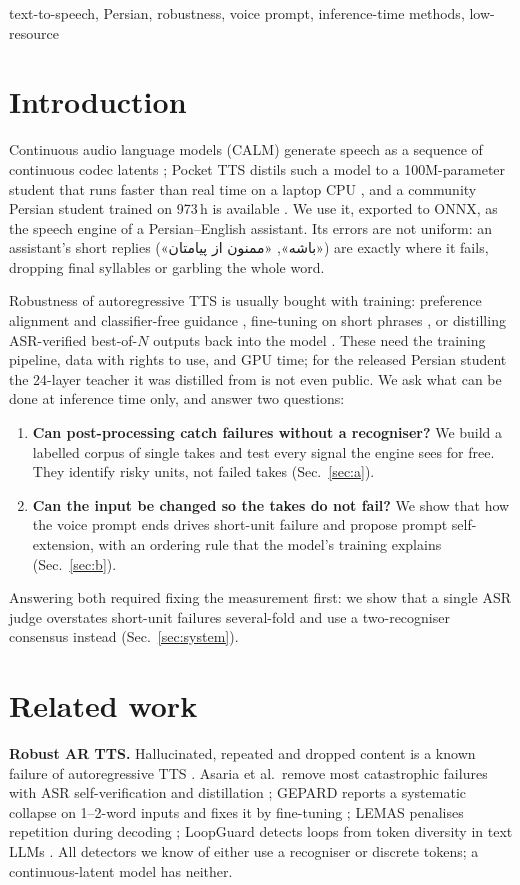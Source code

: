 \documentclass[conference]{IEEEtran}
\newcommand{\fa}[1]{{\persianfont\beginR #1\endR}}
\begin{document}
\begin{IEEEkeywords}
text-to-speech, Persian, robustness, voice prompt, inference-time methods, low-resource
\end{IEEEkeywords}

\section{Introduction}
Continuous audio language models (CALM) generate speech as a sequence of continuous codec latents
\cite{calm2025}; Pocket TTS distils such a model to a 100M-parameter student that runs faster than real
time on a laptop CPU \cite{pockettts2026}, and a community Persian student trained on 973\,h is available
\cite{farsiv2}. We use it, exported to ONNX, as the speech engine of a Persian--English assistant. Its
errors are not uniform: an assistant's short replies (\fa{«باشه»}, \fa{«ممنون از پیامتان»}) are exactly where it fails,
dropping final syllables or garbling the whole word.

Robustness of autoregressive TTS is usually bought with training: preference alignment and classifier-free
guidance \cite{koel2025}, fine-tuning on short phrases \cite{gepard2026}, or distilling ASR-verified
best-of-$N$ outputs back into the model \cite{asaria2026}. These need the training pipeline, data with
rights to use, and GPU time; for the released Persian student the 24-layer teacher it was distilled from is
not even public. We ask what can be done at inference time only, and answer two questions:

\begin{enumerate}
\item \textbf{Can post-processing catch failures without a recogniser?} We build a labelled corpus of
single takes and test every signal the engine sees for free. They identify risky units, not failed takes
(Sec.~\ref{sec:a}).
\item \textbf{Can the input be changed so the takes do not fail?} We show that how the voice prompt ends
drives short-unit failure and propose prompt self-extension, with an ordering rule that the model's
training explains (Sec.~\ref{sec:b}).
\end{enumerate}
Answering both required fixing the measurement first: we show that a single ASR judge overstates short-unit
failures several-fold and use a two-recogniser consensus instead (Sec.~\ref{sec:system}).

\section{Related work}
\textbf{Robust AR TTS.} Hallucinated, repeated and dropped content is a known failure of autoregressive
TTS \cite{koel2025,borodin2026repetition}. Asaria et al.\ remove most catastrophic failures with ASR
self-verification and distillation \cite{asaria2026}; GEPARD reports a systematic collapse on 1--2-word
inputs and fixes it by fine-tuning \cite{gepard2026}; LEMAS penalises repetition during decoding
\cite{lemas2026}; LoopGuard detects loops from token diversity in text LLMs \cite{loopguard2026}. All
detectors we know of either use a recogniser or discrete tokens; a continuous-latent model has neither.
\end{document}
